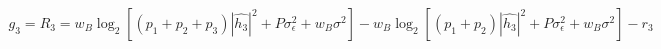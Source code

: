 \documentclass[preview]{standalone}
\begin{document}
\begin{align*}
g_3 = R_3 = w_B \log_2 \left[(p_1 + p_2 + p_3) \left|\hat{h_3}\right|^2 + P \sigma_{\epsilon}^2 + w_B \sigma^2\right] - w_B \log_2 \left[(p_1 + p_2) \left|\hat{h_3}\right|^2 + P \sigma_{\epsilon}^2 + w_B \sigma^2\right] - r_3
\end{align*}
\end{document}
